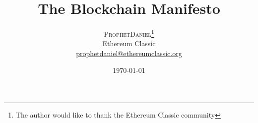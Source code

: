 \documentclass[twoside,twocolumn]{article}
\title{The Blockchain Manifesto} %
\author{%
\textsc{ProphetDaniel}\thanks{The author would like to thank the Ethereum Classic community} \\[1ex] %
\normalsize Ethereum Classic \\ %
\normalsize
\href{mailto:prophetdaniel@ethereumclassic.org}{prophetdaniel@ethereumclassic.org}
}
\date{\today} %
\begin{document}
\maketitle

\cite{Perlroth2014}
% 
% 
% 
% 
% 
% 
% 
\end{document}
